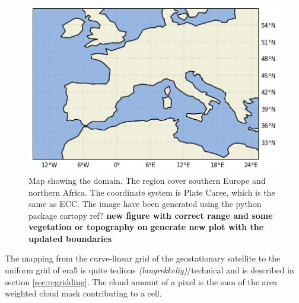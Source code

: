 \begin{figure}[h]
    \centering
    \includegraphics[scale = 0.7]{Chapter2_Theory/images/Domain.png}
    \caption{Map showing the domain. The region cover southern Europe and northern Africa. The coordinate system is Plate Caree, which is the same as ECC. The image have been generated using the python package cartopy ref? \textbf{new figure with correct range and some vegetation or topography on  } \textbf{generate new plot with the updated boundaries}}
    \label{fig:map}
\end{figure}
The mapping from the curve-linear grid of the geostationary satellite to the uniform grid of era5 is quite tedious \textit{(langrekkelig)}/technical and is described in section \ref{sec:regridding}. The cloud amount of a pixel is the sum of the area weighted cloud mask contributing to a cell.


